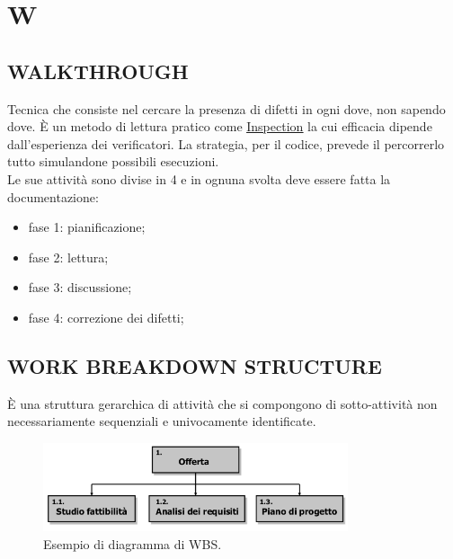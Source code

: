 \newpage
	\flushright{\hyperref[index]{\color{black!65}{Ritorna all'indice}}}\flushleft
	\section{W} \label{sec:W}
		\subsection{WALKTHROUGH}  \label{walkthrough} %
		Tecnica che consiste nel cercare la presenza di difetti in ogni dove, non sapendo dove. È un metodo di lettura pratico come \underline{\hyperref[inspection]{Inspection}} la cui efficacia dipende dall'esperienza dei verificatori. La strategia, per il codice, prevede il percorrerlo tutto simulandone possibili esecuzioni. \\
		Le sue attività sono divise in 4 e in ognuna svolta deve essere fatta la documentazione:
		\begin{itemize}
			\item fase 1: pianificazione;
			\item fase 2: lettura;
			\item fase 3: discussione;
			\item fase 4: correzione dei difetti;
		\end{itemize}
		
		\subsection{WORK BREAKDOWN STRUCTURE}  \label{wbs}
		È una struttura gerarchica di attività che si compongono di sotto-attività non necessariamente sequenziali e univocamente identificate. 
		
		\begin{figure}[H]
			\centering
			\includegraphics[width=0.8\textwidth]{img/wbs}		
			\caption{Esempio di diagramma di WBS.}
		\end{figure} 
	
	
